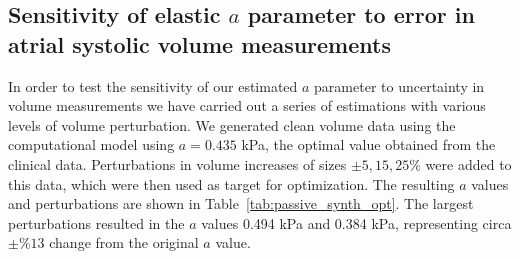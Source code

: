 \subsection{Sensitivity of elastic $a$ parameter to error in atrial systolic volume measurements}
In order to test the sensitivity of our estimated $a$ parameter to
uncertainty in volume measurements we have carried out a series of estimations with
various levels of volume perturbation. 
We generated clean volume data using the computational model using $a = 0.435$ kPa, 
the optimal value obtained from the clinical data. Perturbations in volume increases
of sizes $\pm 5,15, 25 \%$ were added to this data,
which were then used as target for optimization. The resulting $a$ values and perturbations
are shown in Table~\ref{tab:passive_synth_opt}. The largest perturbations resulted
in the $a$ values 0.494 kPa and 0.384 kPa, representing circa $\pm \%13$ change from the original $a$ value.


